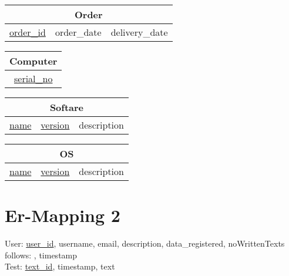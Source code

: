 \vspace{20px}

\begin{minipage}{0.5\textwidth}
    \centering
    \begin{tabular}{|c|c|c|}
        \hline
        \multicolumn{3}{|c|}{Order}\\
        \hline
        \underline{order\_id} & order\_date & delivery\_date \\
        \hline
    \end{tabular}
\end{minipage}
\begin{minipage}{0.5\textwidth}
    \centering
    \begin{tabular}{|c|}
        \hline
        \multicolumn{1}{|c|}{Computer}\\
        \hline
        \underline{serial\_no}\\
        \hline
    \end{tabular}
\end{minipage}

\vspace{20px}
\begin{minipage}{0.5\textwidth}
    \centering
    \begin{tabular}{|c|c|c|}
        \hline
        \multicolumn{3}{|c|}{Softare}\\
        \hline
        \underline{name} & \underline{version} & description\\
        \hline
    \end{tabular}
\end{minipage}
\begin{minipage}{0.5\textwidth}
    \centering
    \begin{tabular}{|c|c|c|}
        \hline
        \multicolumn{3}{|c|}{OS}\\
        \hline
        \underline{name} & \underline{version} & description\\
        \hline
    \end{tabular}
\end{minipage}



\newpage
\section{Er-Mapping 2}
User: \underline{user\_id}, username, email, description, data\_registered, noWrittenTexts \\
follows: , timestamp \\
Test: \underline{text\_id}, timestamp, text \\


